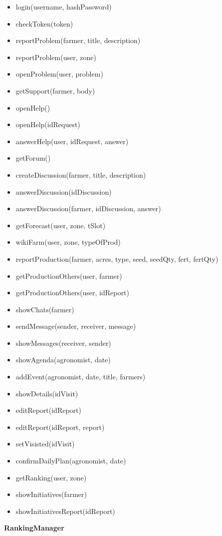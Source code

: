 \begin{itemize}
    \item login(username, hashPassword)
    \item checkToken(token)
    \item reportProblem(farmer, title, description)
    \item reportProblem(user, zone)
    \item openProblem(user, problem)
    \item getSupport(farmer, body)
    \item openHelp()
    \item openHelp(idRequest)
    \item answerHelp(user, idRequest, answer)
    \item getForum()
    \item createDiscussion(farmer, title, description)
    \item answerDiscussion(idDiscussion)
    \item answerDiscussion(farmer, idDiscussion, answer)
    \item getForecast(user, zone, tSlot)
    \item wikiFarm(user, zone, typeOfProd)
    \item reportProduction(farmer, acres, type, seed, seedQty, fert, fertQty)
    \item getProductionOthers(user, farmer)
    \item getProductionOthers(user, idReport)
    \item showChats(farmer)
    \item sendMessage(sender, receiver, message)
    \item showMessages(receiver, sender)
    \item showAgenda(agronomist, date)
    \item addEvent(agronomist, date, title, farmers)
    \item showDetails(idVisit)
    \item editReport(idReport)
    \item editReport(idReport, report)
    \item setVisisted(idVisit)
    \item confirmDailyPlan(agronomist, date)
    \item getRanking(user, zone)
    \item showInitiatives(farmer)
    \item showInitiativesReport(idReport)
\end{itemize}
\textbf{RankingManager}
